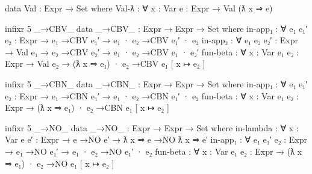 \documentclass{lecturenotes}
\begin{document}
\begin{itemize}
\begin{code}
data Val : Expr → Set where
  Val-ƛ : ∀ {x : Var} {e : Expr} → Val (ƛ x ⇒ e)

infixr 5 _→CBV_
data _→CBV_ : Expr → Expr → Set where
  in-app₁ : ∀ {e₁ e₁′ e₂ : Expr} → e₁ →CBV e₁′ → e₁ · e₂ →CBV e₁′ · e₂
  in-app₂ : ∀ {e₁ e₂ e₂′ : Expr} → Val e₁ → e₂ →CBV e₂′ → e₁ · e₂ →CBV e₁ · e₂′
  fun-beta : ∀ {x : Var} {e₁ e₂ : Expr} → Val e₂ → (ƛ x ⇒ e₁) · e₂ →CBV e₁ [ x ↦ e₂ ]

infixr 5 _→CBN_
data _→CBN_ : Expr → Expr → Set where
  in-app₁ : ∀ {e₁ e₁′ e₂ : Expr} → e₁ →CBN e₁′ → e₁ · e₂ →CBN e₁′ · e₂
  fun-beta : ∀ {x : Var} {e₁ e₂ : Expr} → (ƛ x ⇒ e₁) · e₂ →CBN e₁ [ x ↦ e₂ ]

infixr 5 _→NO_
data _→NO_ : Expr → Expr → Set where
  in-lambda : ∀ {x : Var} {e e′ : Expr} → e →NO e′ → ƛ x ⇒ e →NO ƛ x ⇒ e′
  in-app₁ : ∀ {e₁ e₁′ e₂ : Expr} → e₁ →NO e₁′ → e₁ · e₂ →NO e₁′ · e₂
  fun-beta : ∀ {x : Var} {e₁ e₂ : Expr} → (ƛ x ⇒ e₁) · e₂ →NO e₁ [ x ↦ e₂ ]    
\end{code}
\end{itemize}
\end{document}
